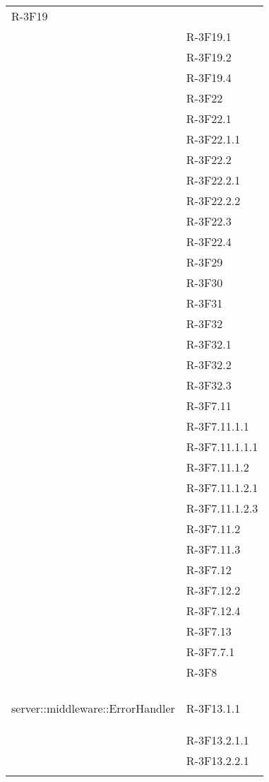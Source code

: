 \begin{longtable}{l p{3cm}}
	R-3F19 \tabularnewline &
	
	R-3F19.1 \tabularnewline &
	
	R-3F19.2 \tabularnewline &
	
	R-3F19.4 \tabularnewline &
	
	R-3F22 \tabularnewline &
	
	R-3F22.1 \tabularnewline &
	
	R-3F22.1.1 \tabularnewline &
	
	R-3F22.2 \tabularnewline &
	
	R-3F22.2.1 \tabularnewline &
	
	R-3F22.2.2 \tabularnewline &
	
	R-3F22.3 \tabularnewline &
	
	R-3F22.4 \tabularnewline &
	
	R-3F29 \tabularnewline &
	
	R-3F30 \tabularnewline &
	
	R-3F31 \tabularnewline &
	
	R-3F32 \tabularnewline &
	
	R-3F32.1 \tabularnewline &
	
	R-3F32.2 \tabularnewline &
	
	R-3F32.3 \tabularnewline &
	
	R-3F7.11 \tabularnewline &
	
	R-3F7.11.1.1 \tabularnewline &
	
	R-3F7.11.1.1.1 \tabularnewline &
	
	R-3F7.11.1.2 \tabularnewline &
	
	R-3F7.11.1.2.1 \tabularnewline &
	
	R-3F7.11.1.2.3 \tabularnewline &
	
	R-3F7.11.2 \tabularnewline &
	
	R-3F7.11.3 \tabularnewline &
	
	R-3F7.12 \tabularnewline &
	
	R-3F7.12.2 \tabularnewline &
	
	R-3F7.12.4 \tabularnewline &
	
	R-3F7.13 \tabularnewline &
	
	R-3F7.7.1 \tabularnewline &
	
	R-3F8 \tabularnewline &\tabularnewline
	\hline
	\hypertarget{server::middleware::ErrorHandler}{server::middleware::ErrorHandler} & R-3F13.1.1 \tabularnewline &
	
	R-3F13.2.1.1 \tabularnewline &
	
	R-3F13.2.2.1 \tabularnewline &
	

\end{longtable}
